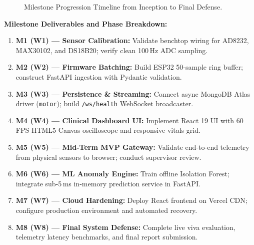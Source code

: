 \documentclass[12pt]{article}
\begin{document}
\begin{figure}[H]
\begin{tcolorbox}[tikzbox, title={Critical Milestone Progression Timeline (Weeks 1 to 8)}, left=4pt, right=4pt, top=4pt, bottom=4pt, width=\linewidth]
{%
}
\end{tcolorbox}
\vspace{-0.25cm}
\caption{Milestone Progression Timeline from Inception to Final Defense.}
\label{fig:milestone_timeline}
\end{figure}

\vspace{0.08cm}
\noindent\textbf{Milestone Deliverables and Phase Breakdown:}
\begin{enumerate}[itemsep=1.0pt, parsep=0pt, topsep=1.5pt]
    \item \textbf{M1 (W1) --- Sensor Calibration:} Validate benchtop wiring for AD8232, MAX30102, and DS18B20; verify clean 100\,Hz ADC sampling.
    \item \textbf{M2 (W2) --- Firmware Batching:} Build ESP32 50-sample ring buffer; construct FastAPI ingestion with Pydantic validation.
    \item \textbf{M3 (W3) --- Persistence \& Streaming:} Connect async MongoDB Atlas driver (\texttt{motor}); build \texttt{/ws/health} WebSocket broadcaster.
    \item \textbf{M4 (W4) --- Clinical Dashboard UI:} Implement React 19 UI with 60\,FPS HTML5 Canvas oscilloscope and responsive vitals grid.
    \item \textbf{M5 (W5) --- Mid-Term MVP Gateway:} Validate end-to-end telemetry from physical sensors to browser; conduct supervisor review.
    \item \textbf{M6 (W6) --- ML Anomaly Engine:} Train offline Isolation Forest; integrate sub-5\,ms in-memory prediction service in FastAPI.
    \item \textbf{M7 (W7) --- Cloud Hardening:} Deploy React frontend on Vercel CDN; configure production environment and automated recovery.
    \item \textbf{M8 (W8) --- Final System Defense:} Complete live viva evaluation, telemetry latency benchmarks, and final report submission.
\end{enumerate}
\clearpage
\end{document}
